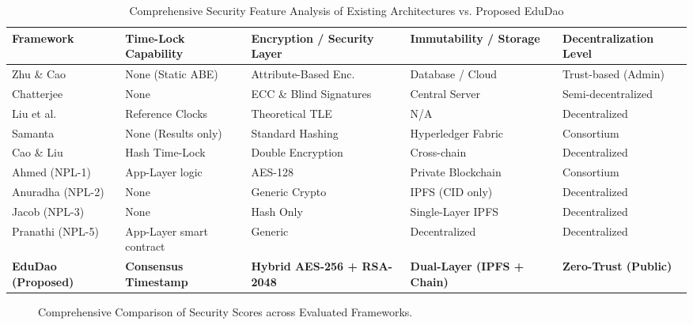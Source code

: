 \documentclass[final,5p,times]{elsarticle}
\begin{document}
\begin{table}[htbp]
\caption{Comprehensive Security Feature Analysis of Existing Architectures vs. Proposed EduDao}
\label{tab:security_compare}
\centering
\renewcommand{\arraystretch}{1.5}
\begin{tabularx}{\linewidth}{>{\raggedright\arraybackslash}p{3cm} X X X X}
\toprule
\textbf{Framework} & \textbf{Time-Lock Capability} & \textbf{Encryption / Security Layer} & \textbf{Immutability / Storage} & \textbf{Decentralization Level} \\ \midrule
Zhu \& Cao \cite{zhu2021secure} & None (Static ABE) & Attribute-Based Enc. & Database / Cloud & Trust-based (Admin) \\
Chatterjee \cite{chatterjee2023efficient} & None & ECC \& Blind Signatures & Central Server & Semi-decentralized \\
Liu et al. \cite{liu2018build} & Reference Clocks & Theoretical TLE & N/A & Decentralized \\
Samanta \cite{samanta2021blockchain} & None (Results only) & Standard Hashing & Hyperledger Fabric & Consortium \\
Cao \& Liu \cite{cao2021ahash} & Hash Time-Lock & Double Encryption & Cross-chain & Decentralized \\
Ahmed (NPL-1) \cite{npl1} & App-Layer logic & AES-128 & Private Blockchain & Consortium \\
Anuradha (NPL-2) \cite{npl2} & None & Generic Crypto & IPFS (CID only) & Decentralized \\
Jacob (NPL-3) \cite{npl3} & None & Hash Only & Single-Layer IPFS & Decentralized \\
Pranathi (NPL-5) \cite{npl5} & App-Layer smart contract & Generic & Decentralized & Decentralized \\
\textbf{EduDao (Proposed)} & \textbf{Consensus Timestamp} & \textbf{Hybrid AES-256 + RSA-2048} & \textbf{Dual-Layer (IPFS + Chain)} & \textbf{Zero-Trust (Public)} \\
\bottomrule
\end{tabularx}
\end{table}

\begin{figure}[htbp]
\centering
{}
\caption{Comprehensive Comparison of Security Scores across Evaluated Frameworks.}
\label{fig:security_bar_chart}
\end{figure}
\end{document}
